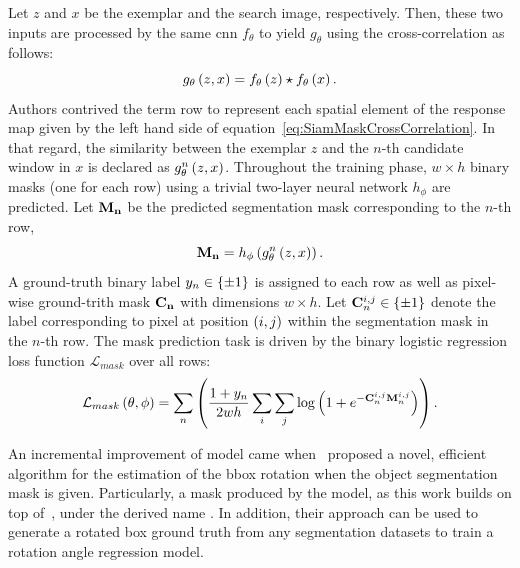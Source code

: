 Let $z$ and $x$ be the exemplar and the search image, respectively. Then, these two inputs are processed by the same \gls{cnn} $f_\theta$ to yield $g_\theta$ using the cross-correlation as follows:
\begin{equation}
    \label{eq:SiamMaskCrossCorrelation}
    {g_\theta} \left( z, x \right) = {f_\theta} \left( z \right) \star {f_\theta} \left( x \right).
\end{equation}
Authors contrived the term \gls{row} to represent each spatial element of the response map given by the left hand side of equation~\ref{eq:SiamMaskCrossCorrelation}. In that regard, the similarity between the exemplar $z$ and the $n$-th candidate window in $x$ is declared as ${{g}_{\theta}^{n}} \left( z, x \right)$. Throughout the training phase, $w \times h$ binary masks (one for each \gls{row}) using a trivial two-layer neural network $h_\phi$ are predicted. Let $\mathbf{M_n}$ be the predicted segmentation mask corresponding to the $n$-th \gls{row},
\begin{equation}
    \mathbf{M_n} = {h_\phi} \left( {{g}_{\theta}^{n}} \left( z, x \right) \right).
\end{equation}
A ground-truth binary label $y_n \in \left\{ {\pm 1} \right\}$ is assigned to each \gls{row} as well as pixel-wise ground-trith mask $\mathbf{C_n}$ with dimensions $w \times h$. Let $\mathbf{C}_n^{i,j} \in \left\{ {\pm 1} \right\}$ denote the label corresponding to pixel at position $\left( {i, j} \right)$ within the segmentation mask in the $n$-th \gls{row}. The mask prediction task is driven by the binary logistic regression loss function $\mathcal{L}_{mask}$ over all \glspl{row}:
\begin{equation}
    {\mathcal{L}_{mask}} \left( \theta, \phi \right) =
    \sum_n
    \left( {
        \frac{1 + y_n}{2wh}
        \sum_{i}
        \sum_{j}
        {\log} \left( 1 + e^{-\mathbf{C}_n^{i,j} \mathbf{M}_n^{i,j}} \right)
    } \right).
\end{equation}

An incremental improvement of  model came when~\cite{Chen2019} proposed a novel, efficient algorithm for the estimation of the \gls{bbox} rotation when the object segmentation mask is given. Particularly, a mask produced by the  model, as this work builds on top of~\cite{Wang2019}, under the derived name . In addition, their approach can be used to generate a rotated box ground truth from any segmentation datasets to train a rotation angle regression model.

